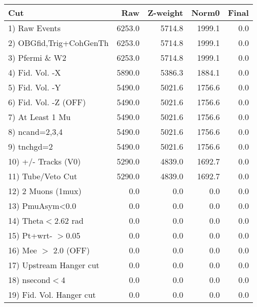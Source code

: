  \begin{table}[h!]\centering
 \begin{tabular}{||l||r|r|r|r||}
 \hline
 \hline
 Cut & Raw & Z-weight & Norm0 & Final \\
 \hline
  1) Raw Events           &      6253.0 &      5714.8 &      1999.1 &         0.0 \\
  2) OBGfid,Trig+CohGenTh &      6253.0 &      5714.8 &      1999.1 &         0.0 \\
  3) Pfermi \& W2         &      6253.0 &      5714.8 &      1999.1 &         0.0 \\
  4) Fid. Vol. -X         &      5890.0 &      5386.3 &      1884.1 &         0.0 \\
  5) Fid. Vol. -Y         &      5490.0 &      5021.6 &      1756.6 &         0.0 \\
  6) Fid. Vol. -Z (OFF)   &      5490.0 &      5021.6 &      1756.6 &         0.0 \\
  7) At Least 1 Mu        &      5490.0 &      5021.6 &      1756.6 &         0.0 \\
  8) ncand=2,3,4          &      5490.0 &      5021.6 &      1756.6 &         0.0 \\
  9) tnchgd=2             &      5490.0 &      5021.6 &      1756.6 &         0.0 \\
 10) +/- Tracks (V0)      &      5290.0 &      4839.0 &      1692.7 &         0.0 \\
 11) Tube/Veto Cut        &      5290.0 &      4839.0 &      1692.7 &         0.0 \\
 12) 2 Muons (1mux)       &         0.0 &         0.0 &         0.0 &         0.0 \\
 13) PmuAsym<0.0          &         0.0 &         0.0 &         0.0 &         0.0 \\
 14) Theta$<$2.62 rad     &         0.0 &         0.0 &         0.0 &         0.0 \\
 15) Pt+wrt- $>$0.05      &         0.0 &         0.0 &         0.0 &         0.0 \\
 16) Mee $>$ 2.0  (OFF)   &         0.0 &         0.0 &         0.0 &         0.0 \\
 17) Upstream Hanger cut  &         0.0 &         0.0 &         0.0 &         0.0 \\
 18) nsecond$<$4          &         0.0 &         0.0 &         0.0 &         0.0 \\
 19) Fid. Vol. Hanger cut &         0.0 &         0.0 &         0.0 &         0.0 \\

\end{tabular}
\end{table}
